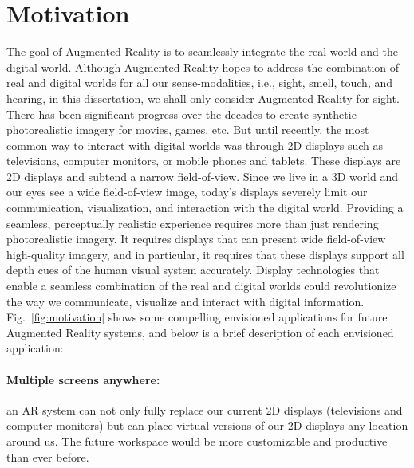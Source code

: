 \section{Motivation}



The goal of Augmented Reality is to seamlessly integrate the real world and the digital world.
Although Augmented Reality hopes to address the combination of real and digital worlds for all our sense-modalities, i.e., sight, smell, touch, and hearing, in this dissertation, we shall only consider Augmented Reality for sight. 
There has been significant progress over the decades to create synthetic photorealistic imagery for movies, games, etc. 
But until recently, the most common way to interact with digital worlds was through 2D displays such as televisions, computer monitors, or mobile phones and tablets. 
These displays are 2D displays and subtend a narrow field-of-view. 
Since we live in a 3D world and our eyes see a wide field-of-view image, today’s displays severely limit our communication, visualization, and interaction with the digital world. 
Providing a seamless, perceptually realistic experience requires more than just rendering photorealistic imagery. 
It requires displays that can present wide field-of-view high-quality imagery, and in particular, it requires that these displays support all depth cues of the human visual system \cite{Palmer:1999, Howard:2002} accurately. 
Display technologies that enable a seamless combination of the real and digital worlds could revolutionize the way we communicate, visualize and interact with digital information.
Fig.~\ref{fig:motivation} shows some compelling envisioned applications for future Augmented Reality systems, and below is a brief description of each envisioned application:

\paragraph{Multiple screens anywhere:} an AR system can not only fully replace our current 2D displays (televisions and computer monitors) but can place virtual versions of our 2D displays any location around us. 
The future workspace would be more customizable and productive than ever before.
